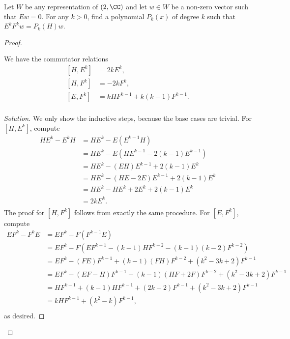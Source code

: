 \documentclass{article}
\begin{document}
\begin{prop}
Let $W$ be any representation of $\sl(2, \CC)$ and let $w \in W$ be a non-zero
vector such that $Ew = 0$. For any $k > 0$, find a polynomial $P_k(x)$ of degree
$k$ such that $E^k F^k w = P_k(H) w$.
\end{prop}

\begin{proof}
\begin{lem}
We have the commutator relations
\[ \begin{aligned}
[H, E^k] &= 2k E^k, \\
[H, F^k] &= -2k F^k, \\
[E, F^k] &= k H F^{k - 1} + k(k - 1) F^{k - 1}. \\
\end{aligned} \]
\end{lem}
\begin{proof}[Solution]
We only show the inductive steps, because the base cases are trivial. For $[H,
E^k]$, compute
\[ \begin{aligned}
H E^k - E^k H  &= H E^k - E (E^{k - 1} H) \\
&= H E^k - E (H E^{k - 1} - 2(k - 1) E^{k - 1}) \\
&= H E^k - (E H) E^{k - 1} + 2(k - 1) E^k \\
&= H E^k - (H E - 2 E) E^{k - 1} + 2(k - 1) E^k \\
&= H E^k - H E^k + 2 E^k + 2(k - 1) E^k \\
&= 2k E^k. \\
\end{aligned} \]
The proof for $[H, F^k]$ follows from exactly the same procedure. For $[E,
F^k]$, compute
\[ \begin{aligned}
E F^k - F^k E &= E F^k - F (F^{k - 1} E) \\
&= E F^k - F (E F^{k - 1} - (k - 1) H F^{k - 2} - (k - 1)(k - 2) F^{k - 2}) \\
&= E F^k - (F E) F^{k - 1} + (k - 1)(F H) F^{k - 2} + (k^2 - 3k + 2) F^{k - 1}
\\
&= E F^k - (E F - H) F^{k - 1} + (k - 1)(H F + 2F) F^{k - 2} + (k^2 - 3k + 2)
F^{k - 1} \\
&= H F^{k - 1} + (k - 1) H F^{k - 1} + (2k - 2) F^{k - 1} + (k^2 - 3k + 2) F^{k
- 1} \\
&= k H F^{k - 1} + (k^2 - k) F^{k - 1}, \\
\end{aligned} \]
as desired.
\end{proof}


\end{proof}
\end{document}

